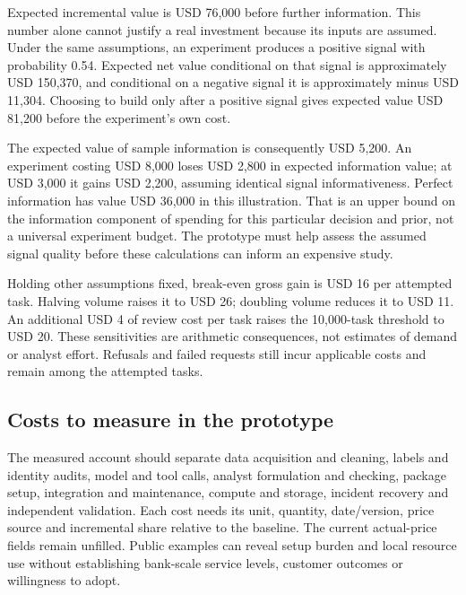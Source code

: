 Expected incremental value is USD 76,000 before further information.
This number alone cannot justify a real investment because its inputs
are assumed. Under the same assumptions, an experiment produces a
positive signal with probability 0.54. Expected net value conditional on
that signal is approximately USD 150,370, and conditional on a negative
signal it is approximately minus USD 11,304. Choosing to build only
after a positive signal gives expected value USD 81,200 before the
experiment's own cost.

The expected value of sample information is consequently USD 5,200. An
experiment costing USD 8,000 loses USD 2,800 in expected information
value; at USD 3,000 it gains USD 2,200, assuming identical signal
informativeness. Perfect information has value USD 36,000 in this
illustration. That is an upper bound on the information component of
spending for this particular decision and prior, not a universal
experiment budget. The prototype must help assess the assumed signal
quality before these calculations can inform an expensive study.
\citep{sp13_economics}

Holding other assumptions fixed, break-even gross gain is USD 16 per
attempted task. Halving volume raises it to USD 26; doubling volume
reduces it to USD 11. An additional USD 4 of review cost per task raises
the 10,000-task threshold to USD 20. These sensitivities are arithmetic
consequences, not estimates of demand or analyst effort. Refusals and
failed requests still incur applicable costs and remain among the
attempted tasks. \citep{sp13_economics_sensitivity}

\hypertarget{costs-to-measure-in-the-prototype}{%
\subsection{Costs to measure in the
prototype}\label{costs-to-measure-in-the-prototype}}

The measured account should separate data acquisition and cleaning,
labels and identity audits, model and tool calls, analyst formulation
and checking, package setup, integration and maintenance, compute and
storage, incident recovery and independent validation. Each cost needs
its unit, quantity, date/version, price source and incremental share
relative to the baseline. The current actual-price fields remain
unfilled. Public examples can reveal setup burden and local resource use
without establishing bank-scale service levels, customer outcomes or
willingness to adopt. \citep{sp13_economics}

